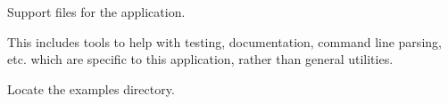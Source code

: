 \documentclass[letterpaper,10pt,english]{sphinxmanual}
\begin{document}
\label{api/support:module-refl1d.support}
Support files for the application.

This includes tools to help with testing, documentation, command line
parsing, etc. which are specific to this application, rather than general
utilities.

\begin{fulllineitems}
\label{api/support:refl1d.support.get_data_path}
Locate the examples directory.

\end{fulllineitems}


\begin{fulllineitems}
\label{api/support:refl1d.support.sample_data}
\end{fulllineitems}
\end{document}
